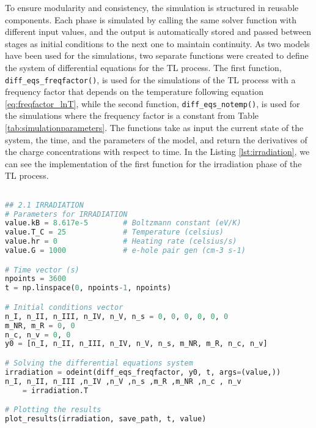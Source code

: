 To ensure modularity and consistency, the simulation is structured in reusable components. Each phase is simulated by calling the same solver function with different input values, and the output is automatically stored and passed between stages as initial conditions to the next one to maintain continuity. As two models have been used for the simulations, two separate functions were created to define the system of differential equations for the TL process. The first function, \texttt{diff\_eqs\_freqfactor()}, is used for the simulations of the TL process with a frequency factor that depends on the temperature following equation \ref{eq:freqfactor_lnT}, while the second function, \texttt{diff\_eqs\_notemp()}, is used for the simulations where the frequency factor is a constant from Table \ref{tab:simulationparameters}. The functions take as input the current state of the system, the time, and the parameters of the model, and return the derivatives of the charge concentrations with respect to time. In the Listing \ref{lst:irradiation}, we can see the implementation of the first function for the irradiation phase of the TL process.

\vspace{10pt}

\renewcommand{\baselinestretch}{1}
\begin{lstlisting}[language=Python, caption={Python simulation of the irradiation phase in TL simulations. It defines the initial parameters, initializes trap and recombination center populations, solves the system of differential equations, and plots the results.}, label=lst:irradiation]

## 2.1 IRRADIATION
# Parameters for IRRADIATION
value.kB = 8.617e-5        # Boltzmann constant (eV/K)
value.T_C = 25             # Temperature (celsius)
value.hr = 0               # Heating rate (celsius/s)
value.G = 1000             # e-hole pair gen (cm-3 s-1)

# Time vector (s)
npoints = 3600
t = np.linspace(0, npoints-1, npoints)

# Initial conditions vector
n_I, n_II, n_III, n_IV, n_V, n_s = 0, 0, 0, 0, 0, 0
m_NR, m_R = 0, 0
n_c, n_v = 0, 0
y0 = [n_I, n_II, n_III, n_IV, n_V, n_s, m_NR, m_R, n_c, n_v]

# Solving the differential equations system
irradiation = odeint(diff_eqs_freqfactor, y0, t, args=(value,))
n_I, n_II, n_III ,n_IV ,n_V ,n_s ,m_R ,m_NR ,n_c , n_v 
    = irradiation.T

# Plotting the results
plot_results(irradiation, save_path, t, value)


\end{lstlisting}
\renewcommand{\baselinestretch}{1.5}

